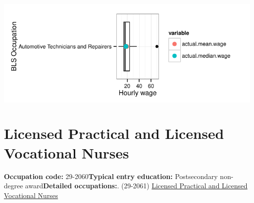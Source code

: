 \documentclass[a4paper,10pt]{article}\usepackage[]{graphicx}\usepackage[]{color}
\makeatletter
\def\maxwidth{ %
  \ifdim\Gin@nat@width>\linewidth
    \linewidth
  \else
    \Gin@nat@width
  \fi
}
\makeatother
\begin{document}
{\centering \includegraphics[width=\maxwidth]{figure/unnamed-chunk-238} 

}


\newpage\section{Licensed Practical and Licensed Vocational Nurses}\textbf{Occupation code:} 29-2060\newline\textbf{Typical entry education:} Postsecondary non-degree award\newline\textbf{Detailed occupations:}. (29-2061)  \href{http://www.bls.gov/oes/current/oes292061.htm}{Licensed Practical and Licensed Vocational Nurses}\newline%
\end{document}
